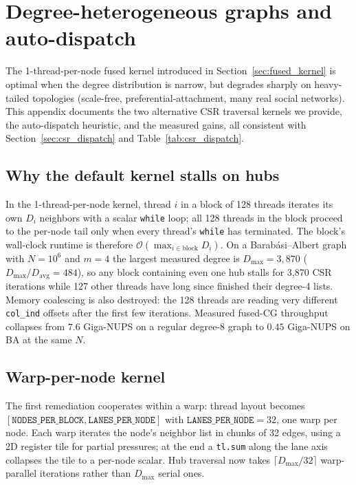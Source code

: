 \documentclass[a4paper,fleqn]{cas-sc}
\theoremstyle{definition}
\theoremstyle{remark}
\newcommand{\bigO}{\mathcal{O}}
\begin{document}
\section{Degree-heterogeneous graphs and auto-dispatch}
\label{app:degree_dispatch}

The 1-thread-per-node fused kernel introduced in Section~\ref{sec:fused_kernel} is optimal when the degree distribution is narrow, but degrades sharply on heavy-tailed topologies (scale-free, preferential-attachment, many real social networks). This appendix documents the two alternative CSR traversal kernels we provide, the auto-dispatch heuristic, and the measured gains, all consistent with Section~\ref{sec:csr_dispatch} and Table~\ref{tab:csr_dispatch}.

\subsection{Why the default kernel stalls on hubs}

In the 1-thread-per-node kernel, thread $i$ in a block of 128 threads iterates its own $D_i$ neighbors with a scalar \texttt{while} loop; all 128 threads in the block proceed to the per-node tail only when every thread's \texttt{while} has terminated. The block's wall-clock runtime is therefore $\bigO(\max_{i \in \text{block}} D_i)$. On a Barab\'{a}si--Albert graph with $N = 10^6$ and $m = 4$ the largest measured degree is $D_{\max} = 3{,}870$ ($D_{\max}/D_{\mathrm{avg}} = 484$), so any block containing even one hub stalls for 3{,}870 CSR iterations while 127 other threads have long since finished their degree-4 lists. Memory coalescing is also destroyed: the 128 threads are reading very different \texttt{col\_ind} offsets after the first few iterations. Measured fused-CG throughput collapses from $7.6$ Giga-NUPS on a regular degree-8 graph to $0.45$ Giga-NUPS on BA at the same $N$.

\subsection{Warp-per-node kernel}
\label{app:warp_kernel}

The first remediation cooperates within a warp: thread layout becomes $[\texttt{NODES\_PER\_BLOCK}, \texttt{LANES\_PER\_NODE}]$ with $\texttt{LANES\_PER\_NODE} = 32$, one warp per node. Each warp iterates the node's neighbor list in chunks of 32 edges, using a 2D register tile for partial pressures; at the end a \texttt{tl.sum} along the lane axis collapses the tile to a per-node scalar. Hub traversal now takes $\lceil D_{\max} / 32 \rceil$ warp-parallel iterations rather than $D_{\max}$ serial ones.
\end{document}

